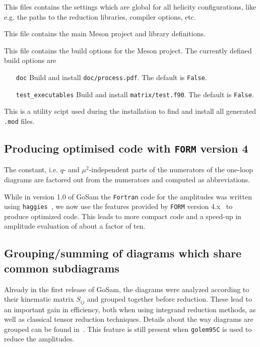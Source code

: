 \documentclass[11pt,a4paper]{refrep}
\newcommand{\gosam}{{\sc GoSam}\xspace}
\newcommand{\golemVC}{{\tt golem95C}\xspace}
\newcommand{\form}{{\tt FORM}\xspace}
\newcommand{\haggies}{{\tt haggies}\xspace}
\begin{document}
 This files contains the settings
which are global for all helicity configurations, 
like e.g. the paths to the reduction libraries, compiler options, etc.

 This file contains the main Meson project and library definitions.

 This file contains the build options for the Meson project. The currently
defined build options are 
\begin{itemize}
   \item[{\tt doc}] Build and install {\tt doc/process.pdf}. The default is {\tt False}.
   \item[{\tt test\_executables}] Build and install {\tt matrix/test.f90}. The default is {\tt False}. 
\end{itemize}

 This is a utility scipt used during the installation to find and
install all generated {\tt {.}mod} files.


\subsection{Producing optimised code  with {\tt FORM} version 4}

The constant, i.e. $q$- and $\mu^2$-independent parts of the numerators
of the one-loop diagrams are factored out from the numerators and computed
as abbreviations. 

While in version 1.0 of \gosam{} the {\tt Fortran} code for the
amplitudes was written using \haggies~\cite{Reiter:2009ts}, we now
use the features provided by \form{} version
4.x~\cite{Kuipers:2012rf} to produce optimized code. This leads to more
compact code and a speed-up in amplitude evaluation of about a factor
of ten.

\subsection{Grouping/summing of diagrams which share common subdiagrams}
\label{sec:grouping_summing}
Already in the first release of \gosam{}, the diagrams were analyzed
according to their kinematic matrix $S_{ij}$ and grouped together
before reduction. These lead to an important gain in efficiency, both
when using integrand reduction methods, as well as 
classical tensor reduction techniques. Details about the way diagrams
are grouped can be found in~\cite{Cullen:2011ac}. This feature is
still present when \golemVC{} is used to reduce the
amplitudes.
\end{document}
